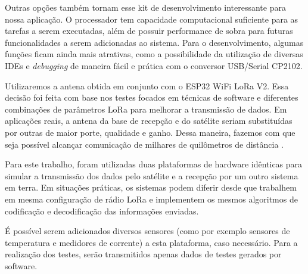 \documentclass[
	12pt,				%
	openright,			%
	twoside,			%
	a4paper,			%
	english,			%
	french,				%
	spanish,			%
	brazil				%
	]{abntex2}
\begin{document}
Outras opções também tornam esse kit de desenvolvimento interessante para nossa aplicação. O processador tem capacidade computacional suficiente para as tarefas a serem executadas, além de possuir performance de sobra para futuras funcionalidades a serem adicionadas ao sistema. Para o desenvolvimento, algumas funções ficam ainda mais atrativas, como a possibilidade da utilização de diversas IDEs e \emph{debugging} de maneira fácil e prática com o conversor USB/Serial CP2102.

Utilizaremos a antena obtida em conjunto com o ESP32 WiFi LoRa V2. Essa decisão foi feita com base nos testes focados em técnicas de software e diferentes combinações de parâmetros LoRa para melhorar a transmissão de dados. Em aplicações reais, a antena da base de recepção e do satélite seriam substituídas por outras de maior porte, qualidade e ganho. Dessa maneira, fazemos com que seja possível alcançar comunicação de milhares de quilômetros de distância \cite{tinygs_2022}.

Para este trabalho, foram utilizadas duas plataformas de hardware idênticas para simular a transmissão dos dados pelo satélite e a recepção por um outro sistema em terra. Em situações práticas, os sistemas podem diferir desde que trabalhem em mesma configuração de rádio LoRa e implementem os mesmos algoritmos de codificação e decodificação das informações enviadas.

É possível serem adicionados diversos sensores (como por exemplo sensores de temperatura e medidores de corrente) a esta plataforma, caso necessário. Para a realização dos testes, serão transmitidos apenas dados de testes gerados por software.
\end{document}
